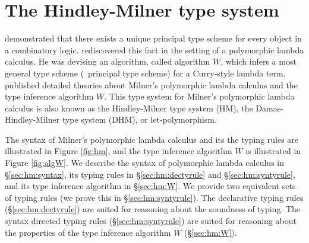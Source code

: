 \section{The Hindley-Milner type system} \label{sec:hm}

\citet{Hindley69} demonstrated that there exists a unique principal type scheme
for every object in a combinatory logic. \citet{Milner78} rediscovered this fact
in the setting of a polymorphic lambda calculus. He was devising
an algorithm, called algorithm $W$, which infers a most general
type scheme (\aka\ principal type scheme) for a Curry-style lambda term.
\citet{Damas85} published detailed theories about Milner's polymorphic
lambda calculus and the type inference algorithm $W$. This type system
for Milner's polymorphic lambda calculus \cite{Milner78,DamMil82,Damas85}
is also known as the Hindley-Milner type system (HM),
the Damas-Hindley-Milner type system (DHM), or let-polymorphism.

The syntax of Milner's polymorphic lambda calculus and its the typing rules
are illustrated in Figure \ref{fig:hm}, and the type inference algorithm $W$
is illustrated in Figure \ref{fig:algW}. We describe the syntax of polymorphic lambda calculus in
\S\ref{sec:hm:syntax}, its typing rules in \S\ref{sec:hm:dectyrule} and
\S\ref{sec:hm:syntyrule}, and its type inference algorithm in \S\ref{sec:hm:W}.
We provide two equivalent sets of typing rules (we prove this in \S\ref{sec:hm:syntyrule}).
The declarative typing rules (\S\ref{sec:hm:dectyrule}) are suited for
reasoning about the soundness of typing.
The syntax directed typing rules (\S\ref{sec:hm:syntyrule}) are suited
for reasoning about the properties of the type inference algorithm $W$
(\S\ref{sec:hm:W}).

